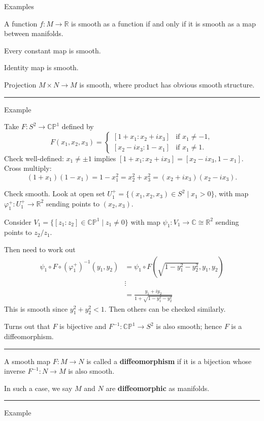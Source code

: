 \documentclass[12pt]{article}
\newcommand{\keyword}[1]{\textbf{#1}}
\newcommand{\sepline}{\rule{\textwidth}{0.4pt}}
\theoremstyle{definition}
\newcommand{\R}{\mathbb{R}}
\newcommand{\C}{\mathbb{C}}
\renewcommand{\P}{\mathbb{P}}
\renewcommand{\phi}{\varphi}
\newcommand{\<}{\left\langle}
\renewcommand{\>}{\right\rangle}
\newcommand{\iso}{\cong}
\begin{document}
Examples

A function $f : M \to \R$ is smooth as a function if and only if it is smooth as a map between manifolds.

Every constant map is smooth.

Identity map is smooth.

Projection $M \times N \to M$ is smooth, where product has obvious smooth structure.

\sepline

Example

Take $F : S^2 \to \C\P^1$ defined by
\[
    F(x_1, x_2, x_3) = \begin{cases}
        [1 + x_1 : x_2 + ix_3] &\text{if } x_1 \ne -1, \\
        [x_2 - ix_3 : 1 - x_1] &\text{if } x_1 \ne 1.
    \end{cases}
\]
Check well-defined: $x_1 \ne \pm1$ implies $[1 + x_1 : x_2 + ix_3] = [x_2 - ix_3, 1 - x_1]$.
Cross multiply:
\[
    (1 + x_1)(1 - x_1) = 1 - x_1^2 = x_2^2 + x_3^2 = (x_2 + ix_3)(x_2 - ix_3).
\]

Check smooth.
Look at open set $U_1^+ = \{(x_1, x_2, x_3) \in S^2 \mid x_1 > 0\}$, with map $\phi_1^+ : U_1^+ \to \R^2$ sending points to $(x_2, x_3)$.

Consider $V_1 = \{[z_1 : z_2] \in \C\P^1 \mid z_1 \ne 0\}$ with map $\psi_1 : V_1 \to \C \iso \R^2$ sending points to $z_2/z_1$.

Then need to work out
\begin{align*}
    \psi_1 \circ F \circ (\phi_1^+)^{-1}(y_1, y_2)
        &= \psi_1 \circ F(\textstyle\sqrt{1 - y_1^2 - y_2^2}, y_1, y_2) \\
        & \vdots \\
        &= \frac{y_1 + iy_2}{1 + \sqrt{1 - y_1^2 - y_2^2}}
\end{align*}
This is smooth since $y_1^2 + y_2^2 < 1$.
Then others can be checked similarly.

Turns out that $F$ is bijective and $F^{-1} : \C\P^1 \to S^2$ is also smooth; hence $F$ is a diffeomorphism.

\sepline

A smooth map $F : M \to N$ is called a \keyword{diffeomorphism} if it is a bijection whose inverse $F^{-1} : N \to M$ is also smooth.

In such a case, we say $M$ and $N$ are \keyword{diffeomorphic} as manifolds.

\sepline

Example
\end{document}
